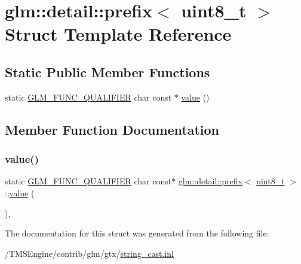 \hypertarget{structglm_1_1detail_1_1prefix_3_01uint8__t_01_4}{}\section{glm\+:\+:detail\+:\+:prefix$<$ uint8\+\_\+t $>$ Struct Template Reference}
\label{structglm_1_1detail_1_1prefix_3_01uint8__t_01_4}
\subsection*{Static Public Member Functions}
\begin{DoxyCompactItemize}
\item 
static \hyperlink{setup_8hpp_a33fdea6f91c5f834105f7415e2a64407}{G\+L\+M\+\_\+\+F\+U\+N\+C\+\_\+\+Q\+U\+A\+L\+I\+F\+I\+ER} char const  $\ast$ \hyperlink{structglm_1_1detail_1_1prefix_3_01uint8__t_01_4_a890818b4dedbe09730336c1ae3913339}{value} ()
\end{DoxyCompactItemize}


\subsection{Member Function Documentation}
\mbox{\label{structglm_1_1detail_1_1prefix_3_01uint8__t_01_4_a890818b4dedbe09730336c1ae3913339}} 
\subsubsection{\texorpdfstring{value()}{value()}}
{\footnotesize\ttfamily static \hyperlink{setup_8hpp_a33fdea6f91c5f834105f7415e2a64407}{G\+L\+M\+\_\+\+F\+U\+N\+C\+\_\+\+Q\+U\+A\+L\+I\+F\+I\+ER} char const$\ast$ \hyperlink{structglm_1_1detail_1_1prefix}{glm\+::detail\+::prefix}$<$ \hyperlink{group__gtc__type__precision_ga93adf6dd9803408f3e3aaf9dedda352b}{uint8\+\_\+t} $>$\+::\hyperlink{_s_d_l__opengl__glext_8h_a8ad81492d410ff2ac11f754f4042150f}{value} (\begin{DoxyParamCaption}{ }\end{DoxyParamCaption})\hspace{0.3cm}{\ttfamily [inline]}, {\ttfamily [static]}}



The documentation for this struct was generated from the following file\+:\begin{DoxyCompactItemize}
\item 
/\+T\+M\+S\+Engine/contrib/glm/gtx/\hyperlink{string__cast_8inl}{string\+\_\+cast.\+inl}\end{DoxyCompactItemize}
